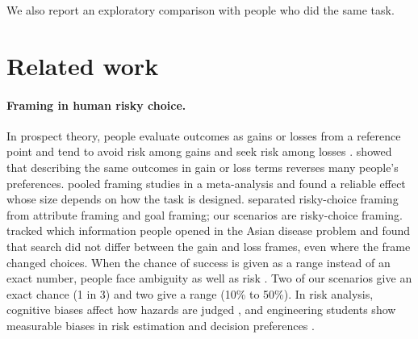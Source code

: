 \documentclass[11pt]{article}
\begin{document}
We also report an exploratory comparison with people who did the same task.

\section{Related work}

\paragraph{Framing in human risky choice.} In prospect theory, people evaluate outcomes as gains or losses from a reference point and tend to avoid risk among gains and seek risk among losses \citep{kahneman1979prospect}. \citet{tversky1981framing} showed that describing the same outcomes in gain or loss terms reverses many people's preferences. \citet{kuhberger1998influence} pooled framing studies in a meta-analysis and found a reliable effect whose size depends on how the task is designed. \citet{levin1998all} separated risky-choice framing from attribute framing and goal framing; our scenarios are risky-choice framing. \citet{schultemecklenbeck2014out} tracked which information people opened in the Asian disease problem and found that search did not differ between the gain and loss frames, even where the frame changed choices. When the chance of success is given as a range instead of an exact number, people face ambiguity as well as risk \citep{ellsberg1961risk}. Two of our scenarios give an exact chance (1 in 3) and two give a range (10\% to 50\%). In risk analysis, cognitive biases affect how hazards are judged \citep{montibeller2015cognitive}, and engineering students show measurable biases in risk estimation and decision preferences \citep{gernand2023set}.
\end{document}

